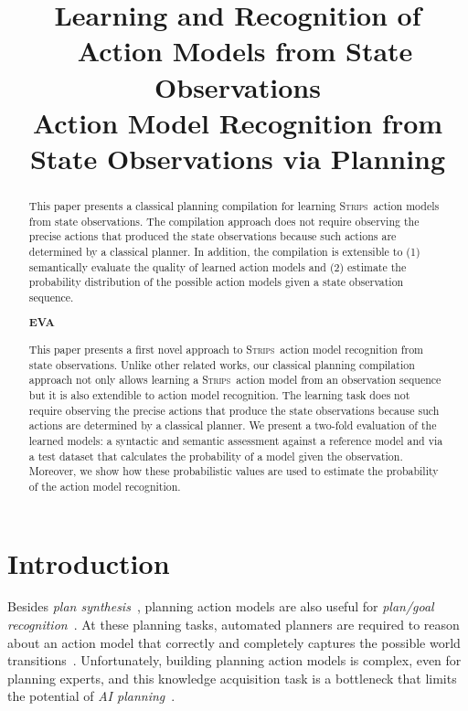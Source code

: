 \documentclass{article}
\title{Learning and Recognition of \strips\ Action Models from State Observations \\ Action Model Recognition from State Observations via Planning}
\author{
}
\newcommand{\strips}{\textsc{Strips}}     %
\begin{document}
\maketitle

\begin{abstract}
This paper presents a classical planning compilation for learning \strips\ action models from state observations. The compilation approach does not require observing the precise actions that produced the state observations because such actions are determined by a classical planner. In addition, the compilation is extensible to (1) semantically evaluate the quality of learned action models and (2) estimate the probability distribution of the possible action models given a state observation sequence.


\textbf{EVA}


This paper presents a first novel approach to \strips\ action model recognition from state observations. Unlike other related works, our classical planning compilation approach not only allows learning a \strips\ action model from an observation sequence but it is also extendible to action model recognition. The learning task does not require observing the precise actions that produce the state observations because such actions are determined by a classical planner. We present a two-fold evaluation of the learned models: a syntactic and semantic assessment against a reference model and via a test dataset that calculates the probability of a model given the observation. Moreover, we show how these probabilistic values are used to estimate the probability of the action model recognition.




\end{abstract}

\section{Introduction}
Besides {\em plan synthesis}~\cite{ghallab2004automated}, planning action models are also useful for {\em plan/goal recognition}~\cite{ramirez2012plan}. At these planning tasks, automated planners are required to reason about an action model that correctly and completely captures the possible world transitions~\cite{geffner:book:2013}. Unfortunately, building planning action models is complex, even for planning experts, and this knowledge acquisition task is a bottleneck that limits the potential of {\em AI planning}~\cite{kambhampati:modellite:AAAI2007}.
\end{document}
